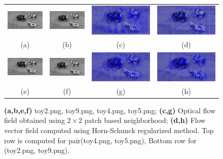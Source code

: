 \documentclass[11pt]{article}
\begin{document}
\begin{figure}[!hbt]
\begin{tabular}{cccc}
\hspace{-30pt}
  \includegraphics[width=0.25\linewidth]{../toy-car-images-bw/toy_formatted4.png} &  
  \includegraphics[width=0.25\linewidth]{../toy-car-images-bw/toy_formatted5.png} &
  \includegraphics[width=0.25\linewidth]{../car4-5_lk.png} &
  \includegraphics[width=0.25\linewidth]{../car4-5_hs.png} \\
  (a) & (b) & (c) & (d)\\
  \hspace{-30pt}
  \includegraphics[width=0.25\linewidth]{../toy-car-images-bw/toy_formatted2.png} &
  \includegraphics[width=0.25\linewidth]{../toy-car-images-bw/toy_formatted9.png} &
  \includegraphics[width=0.25\linewidth]{../car2-9_lk.png} &
  \includegraphics[width=0.25\linewidth]{../car2-9_hs.png} \\
  (e) & (f) & (g) & (h)\\
 \end{tabular}
 \vspace{-10pt}
 \caption{{\bf (a,b,e,f)} toy2.png, toy9.png, toy4.png, toy5.png; {\bf (c,g)} Optical flow field obtained using $2\times2$ patch based neighborhood; {\bf (d,h)} Flow vector field computed using Horn-Schunck regularized method. Top row is computed for pair(toy4.png, toy5.png), Bottom row for (toy2.png, toy9.png).}
 \label{fig9}
\end{figure}
\end{document}
